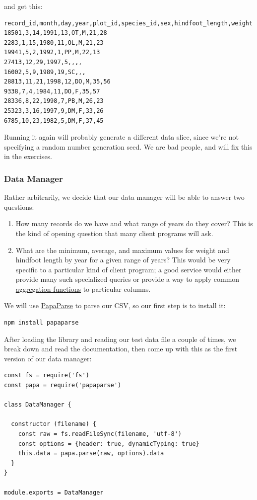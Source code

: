 and get this:

\begin{verbatim}
record_id,month,day,year,plot_id,species_id,sex,hindfoot_length,weight
18501,3,14,1991,13,OT,M,21,28
2283,1,15,1980,11,OL,M,21,23
19941,5,2,1992,1,PP,M,22,13
27413,12,29,1997,5,,,,
16002,5,9,1989,19,SC,,,
28813,11,21,1998,12,DO,M,35,56
9338,7,4,1984,11,DO,F,35,57
28336,8,22,1998,7,PB,M,26,23
25323,3,16,1997,9,DM,F,33,26
6785,10,23,1982,5,DM,F,37,45
\end{verbatim}

Running it again will probably generate a different data slice, since
we're not specifying a random number generation seed. We are bad people,
and will fix this in the exercises.

\subsubsection{Data Manager}\label{s:data-manager}

Rather arbitrarily, we decide that our data manager will be able to
answer two questions:

\begin{enumerate}
\tightlist
\item
  How many records do we have and what range of years do they cover?
  This is the kind of opening question that many client programs will
  ask.
\item
  What are the minimum, average, and maximum values for weight and
  hindfoot length by year for a given range of years? This would be very
  specific to a particular kind of client program; a good service would
  either provide many such specialized queries or provide a way to apply
  common \protect\hyperlink{g:aggregation-function}{aggregation
  functions} to particular columns.
\end{enumerate}

We will use \href{https://www.papaparse.com/}{PapaParse} to parse our
CSV, so our first step is to install it:

\begin{verbatim}
npm install papaparse
\end{verbatim}

After loading the library and reading our test data file a couple of
times, we break down and read the documentation, then come up with this
as the first version of our data manager:

\begin{verbatim}
const fs = require('fs')
const papa = require('papaparse')

class DataManager {

  constructor (filename) {
    const raw = fs.readFileSync(filename, 'utf-8')
    const options = {header: true, dynamicTyping: true}
    this.data = papa.parse(raw, options).data
  }
}

module.exports = DataManager
\end{verbatim}

